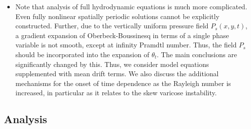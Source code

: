 \documentclass[12pt]{article}
\newcounter{solution}
\begin{document}
\begin{itemize}
    \item Note that analysis of full hydrodynamic equations is much more complicated. Even fully nonlinear spatially periodic solutions cannot be explicitly constructed. Further, due to the vertically uniform pressure field $P_s(x,y,t)$, a gradient expansion of Oberbeck-Boussinesq in terms of a single phase variable is not smooth, except at infinity Pramdtl number. Thus, the field $P_s$ should be incorporated into the expansion of $\theta_t$. The main conclusions are significantly changed by this. Thus, we consider model equations supplemented with mean drift terms. We also discuss the additional mechanisms for the onset of time dependence as the Rayleigh number is increased, in particular as it relates to the skew varicose instability.
  \end{itemize}
\subsection{Analysis}
\end{document}
